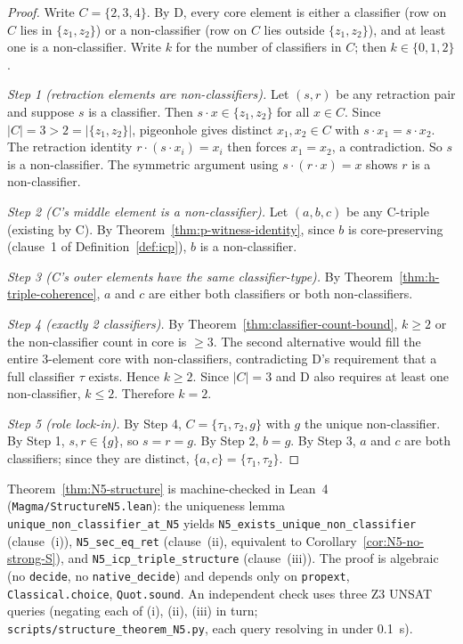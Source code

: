 \documentclass[sigconf,screen]{acmart}
\newcommand{\dotop}{\cdot}
\theoremstyle{remark}
\begin{document}
\begin{proof}
Write $C = \{2, 3, 4\}$. By D, every core element is either a classifier (row on $C$ lies in $\{z_1, z_2\}$) or a non-classifier (row on $C$ lies outside $\{z_1, z_2\}$), and at least one is a non-classifier. Write $k$ for the number of classifiers in $C$; then $k \in \{0, 1, 2\}$.

\emph{Step 1 (retraction elements are non-classifiers).} Let $(s, r)$ be any retraction pair and suppose $s$ is a classifier. Then $s \dotop x \in \{z_1, z_2\}$ for all $x \in C$. Since $|C| = 3 > 2 = |\{z_1, z_2\}|$, pigeonhole gives distinct $x_1, x_2 \in C$ with $s \dotop x_1 = s \dotop x_2$. The retraction identity $r \dotop (s \dotop x_i) = x_i$ then forces $x_1 = x_2$, a contradiction. So $s$ is a non-classifier. The symmetric argument using $s \dotop (r \dotop x) = x$ shows $r$ is a non-classifier.

\emph{Step 2 (C's middle element is a non-classifier).} Let $(a, b, c)$ be any C-triple (existing by C). By Theorem~\ref{thm:p-witness-identity}, since $b$ is core-preserving (clause~1 of Definition~\ref{def:icp}), $b$ is a non-classifier.

\emph{Step 3 (C's outer elements have the same classifier-type).} By Theorem~\ref{thm:h-triple-coherence}, $a$ and $c$ are either both classifiers or both non-classifiers.

\emph{Step 4 (exactly 2 classifiers).} By Theorem~\ref{thm:classifier-count-bound}, $k \geq 2$ or the non-classifier count in core is $\geq 3$. The second alternative would fill the entire 3-element core with non-classifiers, contradicting D's requirement that a full classifier $\tau$ exists. Hence $k \geq 2$. Since $|C| = 3$ and D also requires at least one non-classifier, $k \leq 2$. Therefore $k = 2$.

\emph{Step 5 (role lock-in).} By Step 4, $C = \{\tau_1, \tau_2, g\}$ with $g$ the unique non-classifier. By Step 1, $s, r \in \{g\}$, so $s = r = g$. By Step 2, $b = g$. By Step 3, $a$ and $c$ are both classifiers; since they are distinct, $\{a, c\} = \{\tau_1, \tau_2\}$. \qedhere
\end{proof}

Theorem~\ref{thm:N5-structure} is machine-checked in Lean~4 (\texttt{Magma/StructureN5.lean}): the uniqueness lemma \texttt{unique\_non\_classifier\_at\_N5} yields \texttt{N5\_exists\_unique\_non\_classifier} (clause~(i)), \texttt{N5\_sec\_eq\_ret} (clause~(ii), equivalent to Corollary~\ref{cor:N5-no-strong-S}), and \texttt{N5\_icp\_triple\_structure} (clause~(iii)). The proof is algebraic (no \texttt{decide}, no \texttt{native\_decide}) and depends only on \texttt{propext}, \texttt{Classical.choice}, \texttt{Quot.sound}. An independent check uses three Z3 UNSAT queries (negating each of (i), (ii), (iii) in turn; \texttt{scripts/structure\_theorem\_N5.py}, each query resolving in under 0.1~s).
\end{document}
